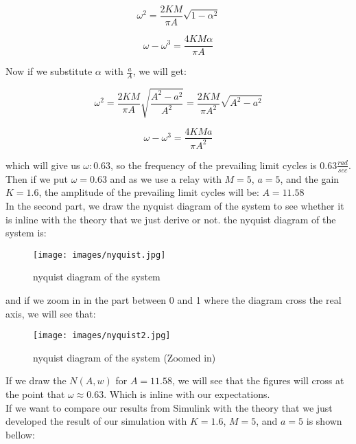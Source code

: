 \documentclass[11pt]{scrartcl} %
\begin{document}
\begin{itemize}
\begin{equation}
    \omega ^2 = \frac{2KM}{\pi A}\sqrt{1-\alpha ^2}
\end{equation}

\begin{equation}
    \omega - \omega^3 = \frac{4KM\alpha}{\pi A}
\end{equation}

Now if we substitute $\alpha$ with $\frac{a}{A}$, we will get:

\begin{equation}
    \omega ^2 = \frac{2KM}{\pi A}\sqrt{\frac{A^2 - a^2}{A^2}} = \frac{2KM}{\pi A^2}\sqrt{A^2 - a^2}
\end{equation}

\begin{equation}
    \omega - \omega^3 = \frac{4K M a}{\pi A^2}
\end{equation}

which will give us $\omega: 0.63$, so the frequency of the prevailing limit
cycles is $0.63 \frac{rad}{sec}$.\\

Then if we put $\omega = 0.63$ and as we use a relay with $M = 5$, $a=5$, and the gain $K = 1.6$, the amplitude of the prevailing limit cycles will be: $A = 11.58$\\


In the second part, we draw the nyquist diagram of the system to see whether it is inline with the theory that we just derive or not. the nyquist diagram of the system is:

\begin{figure}[H]
	\centering
	\texttt{[image: images/nyquist.jpg]}
	\caption{nyquist diagram of the system}
\end{figure}

and if we zoom in in the part between 0 and 1 where the diagram cross the real axis, we will see that:

\begin{figure}[H]
	\centering
	\texttt{[image: images/nyquist2.jpg]}
	\caption{nyquist diagram of the system (Zoomed in)}
\end{figure}

If we draw the $N(A,w)$ for $A=11.58$, we will see that the figures will cross at the point that $\omega \approx 0.63$. Which is inline with our expectations.\\

If we want to compare our results from Simulink with the theory that we just developed the result of our simulation with $K=1.6$, $M=5$, and $a=5$ is shown bellow:


\end{itemize}
\end{document}
